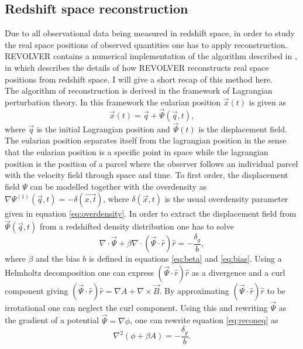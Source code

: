 \subsection{Redshift space reconstruction}\label{sec:reconstruction}
Due to all observational data being measured in redshift space, in order to study
the real space positions of observed quantities one has to apply reconstruction. REVOLVER contains a numerical implementation of
the algorithm described in \cite{Nadathur_2018}, in which describes the details
of how REVOLVER reconstructs real space positions from redshift space. I will give a
short recap of this method here.\\\indent
The algorithm of reconstruction is derived in the framework of Lagrangian
perturbation theory. In this framework the eularian position $\vec{x}(t)$ is
given as
\begin{equation}
    \vec{x}(t)=\vec{q}+\vec{\Psi}(\vec{q},t),
\end{equation}
where $\vec{q}$ is the initial Lagrangian position and $\vec{\Psi}(t)$ is the
displacement field. The eularian position separates itself from the lagrangian
position in the sense that the eularian position is a specific point in space
while the lagrangian position is the position of a parcel where the observer
follows an individual parcel with the velocity field through space and time.
To first order, the displacement field $\Psi$ can be modelled together with the
overdensity as $\nabla\Psi^{(1)}(\vec{q},t)=-\delta(\vec{x,t})$, where
$\delta(\vec{x},t)$ is the usual overdensity parameter given in equation \ref{eq:overdensity}.
In order to extract the displacement field from $\vec{\Psi}(\vec{q},t)$ from a
redshifted density distribution one has to solve \cite{recondisplace}
\begin{equation}\label{eq:reconeq}
    \nabla\cdot\vec{\Psi}+\beta\nabla\cdot(\vec{\Psi}\cdot\hat{r})\hat{r}=-\frac{\delta_g}{b},
\end{equation}
where $\beta$ and the bias $b$ is defined in equations
\ref{eq:beta} and \ref{eq:bias}. Using a Helmholtz decomposition one can
express $(\vec{\Psi}\cdot\hat{r})\hat{r}$ as a divergence and a curl component giving $(\vec{\Psi}\cdot\hat{r})\hat{r}=\nabla A + \nabla \times \vec{B}$.
By approximating $(\vec{\Psi}\cdot\hat{r})\hat{r}$ to be irrotational one can neglect
the curl component.
Using this and rewriting $\vec{\Psi}$ as the gradient of a
potential $\vec{\Psi}=\nabla\phi$, one can rewrite equation \ref{eq:reconeq} as
\begin{equation}
    \nabla^2(\phi+\beta A)=-\frac{\delta_g}{b}.
\end{equation}
